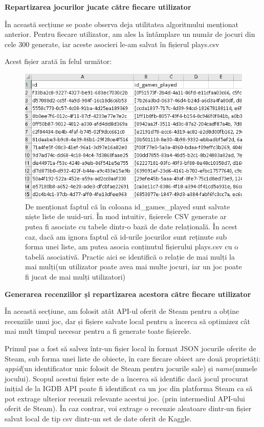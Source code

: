 \documentclass[12pt,a4paper]{report}
\begin{document}
\bigskip
\textbf{Repartizarea jocurilor jucate către fiecare utilizator}
\bigskip

În această secțiune se poate observa deja utilitatea algoritmului menționat anterior. Pentru fiecare utilizator, am ales la întâmplare un număr de jocuri din cele 300 generate, iar aceste asocieri le-am salvat în fișierul plays.csv

Acest fișier arată în felul următor:

\begin{figure}[H]
\centering
\caption{}
\includegraphics[scale = 0.8]{exemplu_12_plays}
\caption*{De menționat faptul că în coloana id\_games\_played sunt salvate niște liste de uuid-uri. În mod intuitiv, fișierele CSV generate ar putea fi asociate cu tabele dintr-o bază de date relațională. În acest caz, dacă am ignora faptul că id-urile jocurilor sunt reținute sub forma unei liste, am putea asocia conținutul fișierului plays.csv cu o tabelă asociativă. Practic aici se identifică o relație de mai mulți la mai mulți(un utilizator poate avea mai multe jocuri, iar un joc poate fi jucat de mai mulți utilizatori) }
\end{figure}

\bigskip
\textbf{Generarea recenziilor și repartizarea acestora către fiecare utilizator}
\bigskip

În această secțiune, am folosit atât API-ul oferit de Steam pentru a obține recenziile unui joc, dar și fișiere salvate local pentru a încerca să optimizez cât mai mult timpul necesar pentru a fi generate toate fișierele.

Primul pas a fost să salvez într-un fișier local în format JSON jocurile oferite de Steam, sub forma unei liste de obiecte, în care fiecare obiect are două proprietăți:  \emph{appid}(un identificator unic folosit de Steam pentru jocurile sale) și \emph{name}(numele jocului). Scopul acestui fișier este de a încerca să identific dacă jocul procurat inițial de la IGDB API poate fi identificat ca un joc din platforma Steam ca să pot extrage ulterior recenzii relevante acestui joc. (prin intermediul API-ului oferit de Steam). În caz contrar, voi extrage o recenzie aleatoare dintr-un fișier salvat local de tip csv dintr-un set de date oferit de Kaggle. \cite{17}
\end{document}
